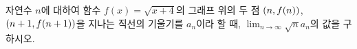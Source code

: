 자연수 $n$에 대하여 함수 $f(x)=\sqrt{x+4}$의 그래프 위의 두 점 $(n{,}\mkern3mu\mathopen{}f(n))$, $(n+1{,}\mkern3mu\mathopen{}f(n+1))$을 지나는 직선의 기울기를 $a_n$이라 할 때, $\displaystyle\lim_{n\to\infty}\sqrt{n}a_n$의 값을 구하시오.
